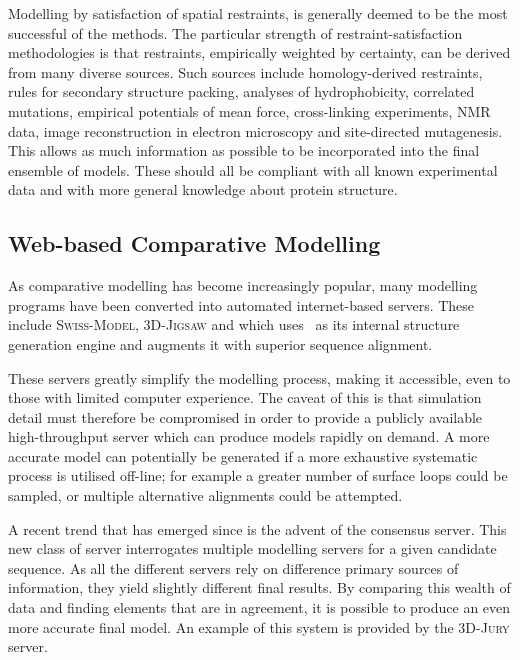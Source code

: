 Modelling by satisfaction of spatial restraints, is generally deemed to be the most successful of the methods. The particular strength of  restraint-satisfaction methodologies is that restraints, empirically weighted by certainty, can be derived from many diverse sources. Such sources include homology-derived restraints,
rules for secondary structure packing\cite{METHOD:Coh89}, analyses of hydrophobicity\cite{METHOD:Asz94}, correlated mutations\cite{METHOD:Tay94}, empirical potentials of mean force\cite{METHOD:Sip90}, cross-linking experiments, NMR data\cite{METHOD:COMPOSER}, image reconstruction in electron microscopy and site-directed mutagenesis\cite{METHOD:Boi93}. This allows as much information as possible to be incorporated into the final ensemble of models. These should all be compliant with all known experimental data and with more general knowledge about protein structure.



\subsection{Web-based Comparative Modelling}

As comparative modelling has become increasingly popular, many modelling programs have been converted into automated
internet-based servers. These include \textsc{Swiss-Model}\cite{METHOD:SWISSMODEL},
\textsc{3D-Jigsaw}\cite{METHOD:3DJIGSAW} and \esypred\cite{METHOD:Esypred3D}
which uses \modeller\ as its internal structure generation engine and augments
it with superior sequence alignment. 

These servers greatly simplify the modelling
process, making it accessible, even to those with limited computer experience. The caveat of this is that simulation detail must therefore be compromised in order to provide a publicly available high-throughput server
which can produce models rapidly on demand. A more accurate model can potentially be generated if a more exhaustive systematic process is utilised off-line;
for example a greater number of surface loops could be sampled, or multiple alternative alignments could be attempted. 


A recent trend that has emerged since  is the advent of the consensus server\cite{METHOD:CASP6:CM}. This new class of server interrogates multiple modelling servers for
a given candidate sequence. As all the different servers rely on difference
primary sources of information, they yield slightly different final results. By comparing
this wealth of data and finding elements that are in agreement, it is possible to produce an even more accurate final model. An example of this system is provided by the \textsc{3D-Jury} server\cite{METHOD:3DJURY}. 






